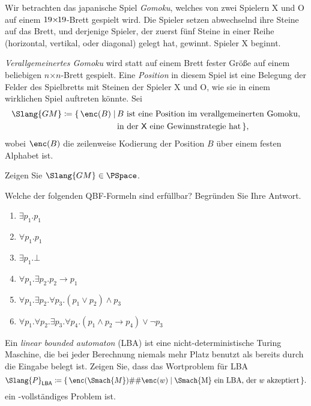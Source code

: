 \documentclass[german]{latteachCD}[2017/03/28]
\begin{document}
\begin{exercise}
  Wir betrachten das japanische Spiel \emph{Gomoku}, welches von zwei Spielern
  \textsf{X} und \textsf{O} auf einem $19{\times}\mskip-2mu19$-Brett %
  gespielt wird.  Die Spieler setzen abwechselnd ihre Steine auf das Brett, und
  derjenige Spieler, der zuerst fünf Steine in einer Reihe (horizontal,
  vertikal, oder diagonal) gelegt hat, gewinnt.  Spieler \textsf{X} beginnt.

  \emph{Verallgemeinertes Gomoku} wird statt auf einem Brett fester Größe auf
  einem beliebigen $n\mathord{\times}n$-Brett gespielt.  Eine \emph{Position} in
  diesem Spiel ist eine Belegung der Felder des Spielbretts mit Steinen der
  Spieler \textsf{X} und \textsf{O}, wie sie in einem wirklichen Spiel auftreten
  könnte.  Sei
  \begin{align*}
    \Slang{GM} \coloneqq \{\,\enc(B) \mid \, %
    & B \text{ ist eine Position im verallgemeinerten Gomoku,} \\
    & \text{in der \textsf{X} eine Gewinnstrategie hat}\,\},
  \end{align*}
  wobei $\enc(B)$ die zeilenweise Kodierung der Position $B$ über einem festen
  Alphabet ist.

  Zeigen Sie $\Slang{GM} \in \PSpace$.
\end{exercise}

\begin{exercise}
  Welche der folgenden QBF-Formeln sind erfüllbar?  Begründen Sie Ihre Antwort.
  \begin{enumerate}
  \item $\exists p_{1}. p_{1}$
  \item $\forall p_{1}. p_{1}$
  \item $\exists p_{1}. \bot$
  \item $\forall p_{1}. \exists p_{2}. p_{2} \to p_{1}$
  \item $\forall p_{1}. \exists p_{2}. \forall p_{3}. (p_{1} \lor p_{2}) \land
    p_{3}$
  \item $\forall p_{1}. \forall p_{2}. \exists p_{3}. \forall p_{4}. (p_{1}
    \land p_{2} \to p_{4}) \lor \lnot p_{3}$
  \end{enumerate}

\end{exercise}

\begin{exercise}
  Ein \emph{linear bounded automaton} (LBA) ist eine nicht-deterministische
  Turing Maschine, die bei jeder Berechnung niemals mehr Platz benutzt als
  bereits durch die Eingabe belegt ist.  Zeigen Sie, dass das Wortproblem für
  LBA
  \begin{equation*}
    \Slang{P}_{\mathsf{LBA}} \coloneqq \{\,\enc(\Smach{M})\#\#\enc(w) \mid
    \text{\Smach{M} ein LBA, der $w$ akzeptiert} \,\}.
  \end{equation*}
  ein \PSpace-vollständiges Problem ist.
\end{exercise}
\end{document}

